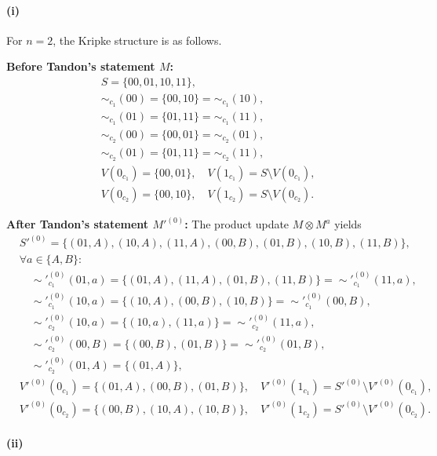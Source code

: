 \paragraph*{(i)}
For $n=2$, the Kripke structure is as follows.

\textbf{Before Tandon's statement $M$:}
\begin{align*}
    &S = \{ 00, 01, 10, 11 \}, \\
    &\sim_{c_1}(00) = \{00,10\} = \sim_{c_1}(10), \\
    &\sim_{c_1}(01) = \{01,11\} = \sim_{c_1}(11), \\
    &\sim_{c_2}(00) = \{00,01\} = \sim_{c_2}(01), \\
    &\sim_{c_2}(01) = \{01,11\} = \sim_{c_2}(11), \\
    &V(0_{c_1}) = \{ 00, 01 \},\quad V(1_{c_1}) = S \setminus V(0_{c_1}), \\
    &V(0_{c_2}) = \{ 00, 10 \},\quad V(1_{c_2}) = S \setminus V(0_{c_2}).
\end{align*}

\textbf{After Tandon's statement $M'^{(0)}$:} 
The product update $M \otimes M^a$ yields
\begin{align*}
    &S'^{(0)} = \{ (01,A), (10,A), (11,A),
           (00,B), (01,B), (10,B), (11,B) \}, \\
    &\forall a \in \{A,B\}: \\
    &\quad \sim'^{(0)}_{c_1}(01,a) = \{(01,A),(11,A),(01,B),(11,B)\} 
        = \sim'^{(0)}_{c_1}(11,a), \\
    &\quad \sim'^{(0)}_{c_1}(10,a) = \{(10,A),(00,B),(10,B)\} 
        = \sim'^{(0)}_{c_1}(00,B), \\
    &\quad \sim'^{(0)}_{c_2}(10,a) = \{(10,a),(11,a)\} = \sim'^{(0)}_{c_2}(11,a), \\
    &\quad \sim'^{(0)}_{c_2}(00,B) = \{(00,B),(01,B)\} = \sim'^{(0)}_{c_2}(01,B), \\
    &\quad \sim'^{(0)}_{c_2}(01,A) = \{(01,A)\}, \\
    &V'^{(0)}(0_{c_1}) = \{ (01,A), (00,B), (01,B) \},\quad
        V'^{(0)}(1_{c_1}) = S'^{(0)} \setminus V'^{(0)}(0_{c_1}), \\
    &V'^{(0)}(0_{c_2}) = \{ (00,B), (10,A), (10,B) \},\quad
        V'^{(0)}(1_{c_2}) = S'^{(0)} \setminus V'^{(0)}(0_{c_2}).
\end{align*}

\paragraph*{(ii)}

